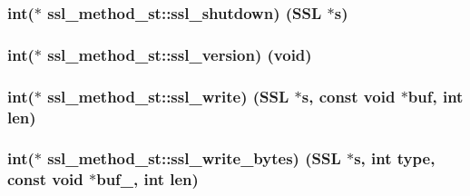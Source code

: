 \subsubsection[{\texorpdfstring{ssl\+\_\+shutdown}{ssl_shutdown}}]{\setlength{\rightskip}{0pt plus 5cm}int($\ast$ ssl\+\_\+method\+\_\+st\+::ssl\+\_\+shutdown) ({\bf S\+SL} $\ast$s)}\hypertarget{structssl__method__st_a7dc97d1a59c10baa705a23e5aa4f7546}{}\label{structssl__method__st_a7dc97d1a59c10baa705a23e5aa4f7546}
\subsubsection[{\texorpdfstring{ssl\+\_\+version}{ssl_version}}]{\setlength{\rightskip}{0pt plus 5cm}int($\ast$ ssl\+\_\+method\+\_\+st\+::ssl\+\_\+version) (void)}\hypertarget{structssl__method__st_a84b47953e71129319b367394a6daca4b}{}\label{structssl__method__st_a84b47953e71129319b367394a6daca4b}
\subsubsection[{\texorpdfstring{ssl\+\_\+write}{ssl_write}}]{\setlength{\rightskip}{0pt plus 5cm}int($\ast$ ssl\+\_\+method\+\_\+st\+::ssl\+\_\+write) ({\bf S\+SL} $\ast$s, const void $\ast$buf, int {\bf len})}\hypertarget{structssl__method__st_aeaa1745bfd8cea08b5d943fa49c1804a}{}\label{structssl__method__st_aeaa1745bfd8cea08b5d943fa49c1804a}
\subsubsection[{\texorpdfstring{ssl\+\_\+write\+\_\+bytes}{ssl_write_bytes}}]{\setlength{\rightskip}{0pt plus 5cm}int($\ast$ ssl\+\_\+method\+\_\+st\+::ssl\+\_\+write\+\_\+bytes) ({\bf S\+SL} $\ast$s, int {\bf type}, const void $\ast$buf\+\_\+, int {\bf len})}\hypertarget{structssl__method__st_a20933c416539a546d3749a725e0602e7}{}\label{structssl__method__st_a20933c416539a546d3749a725e0602e7}
